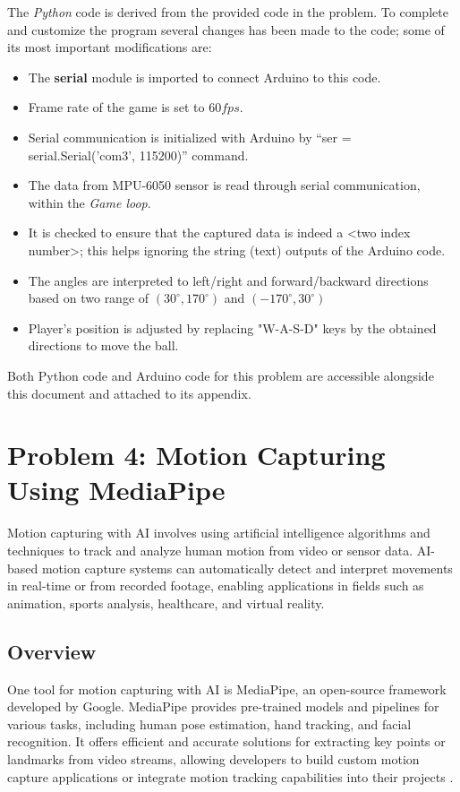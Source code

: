 \documentclass[conference]{IEEEtran}
\begin{document}
The \textit{Python} code is derived from the provided code in the problem\cite{b5}. To complete and customize the program several changes has been made to the code; some of its most important modifications are:
\begin{itemize}
    \item The \textbf{serial} module is imported to connect Arduino to this code.
    \item Frame rate of the game is set to \(60 fps\).
    \item Serial communication is initialized with Arduino by ``ser = serial.Serial('com3', 115200)'' command.
    \item The data from MPU-6050 sensor is read through serial communication, within the \textit{Game loop}.
    \item It is checked to ensure that the captured data is indeed a <two index number>; this helps ignoring the string (text) outputs of the Arduino code.
    \item The angles are interpreted to left/right and forward/backward directions based on two range of $(30^\circ, 170^\circ)$ and $(-170^\circ, 30^\circ)$
    \item Player's position is adjusted by replacing "W-A-S-D" keys by the obtained directions to move the ball.
\end{itemize}
\vspace{5px}
Both Python code and Arduino code for this problem are accessible alongside this document and attached to its appendix.
\vspace{10px}





\section{Problem 4: Motion Capturing Using MediaPipe}
Motion capturing with AI involves using artificial intelligence algorithms and techniques to track and analyze human motion from video or sensor data. AI-based motion capture systems can automatically detect and interpret movements in real-time or from recorded footage, enabling applications in fields such as animation, sports analysis, healthcare, and virtual reality.

\subsection{Overview}
One tool for motion capturing with AI is MediaPipe, an open-source framework developed by Google. MediaPipe provides pre-trained models and pipelines for various tasks, including human pose estimation, hand tracking, and facial recognition. It offers efficient and accurate solutions for extracting key points or landmarks from video streams, allowing developers to build custom motion capture applications or integrate motion tracking capabilities into their projects \cite{b9}.
\end{document}
